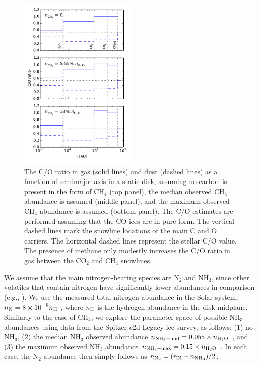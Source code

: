 \documentclass[apj]{emulateapj}
\begin{document}
\begin{figure}[h!]
\centering
\includegraphics[width=0.5\textwidth]{C_O_ratio_CH4.pdf}
\caption{The C/O ratio in gas (solid lines) and dust (dashed lines) as a function of semimajor axis in a static disk, assuming no carbon is present in the form of CH$_4$ (top panel), the median observed CH$_4$ abundance is assumed (middle panel), and the maximum observed CH$_4$ abundance is assumed (bottom panel). The C/O estimates are performed assuming that the CO ices are in pure form. The vertical dashed lines mark the snowline locations of the main C and O carriers. The horizontal dashed lines represent the stellar C/O value. The presence of methane only modestly increases the C/O ratio in gas between the CO$_2$ and CH$_4$ snowlines.} 
\label{fig:COstatic}
\end{figure}

We assume that the main nitrogen-bearing species are N$_2$ and NH$_3$, since other volatiles that contain nitrogen have significantly lower abundances in comparison (e.g., \citealt{mumma11}). We use the measured total nitrogen abundance in the Solar system, $n_{\rm N}=8 \times 10^{-5} n_{\rm H}$ \citep{lodders03}, where $n_{\rm H}$ is the hydrogen abundance in the disk midplane. Similarly to the case of CH$_4$, we explore the parameter space of possible NH$_3$ abundances using data from the Spitzer c2d Legacy ice survey, as follows: (1) no NH$_3$, (2) the median NH$_3$ observed abundance $n_{\rm NH_3-mid}=0.055 \times n_{\rm H_2O}$ \citep{oberg11a}, and (3) the maximum observed NH$_3$ abundance $n_{\rm NH_3-max}=0.15 \times n_{\rm H_2O}$ \citep{bottinelli10}. In each case, the N$_2$ abundance then simply follows as $n_{\rm N_2}=(n_{\rm N}-n_{\rm NH_3})/2$. 
\end{document}
